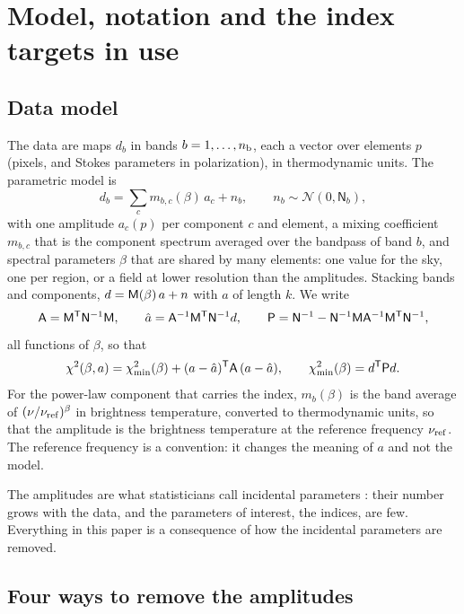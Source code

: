 \section{Model, notation and the index targets in use}
\label{sec:model}

\subsection{Data model}

The data are maps $d_b$ in bands $b = 1,\dots,n_{\rm b}$, each a vector over elements $p$ (pixels,
and Stokes parameters in polarization), in thermodynamic units. The parametric model is
\begin{equation}
  d_b = \sum_c m_{b,c}(\beta)\, a_c + n_b , \qquad n_b \sim \mathcal{N}(0, \mathsf{N}_b),
  \label{eq:model}
\end{equation}
with one amplitude $a_c(p)$ per component $c$ and element, a mixing coefficient $m_{b,c}$ that is the
component spectrum averaged over the bandpass of band $b$, and spectral parameters $\beta$ that are
shared by many elements: one value for the sky, one per region, or a field at lower resolution than
the amplitudes. Stacking bands and components, $d = \mathsf{M}(\beta)\,a + n$ with $a$ of length $k$. We write
\begin{equation}
  \mathsf{A} = \mathsf{M}^{\mathsf{T}} \mathsf{N}^{-1} \mathsf{M} , \qquad \hat a = \mathsf{A}^{-1} \mathsf{M}^{\mathsf{T}} \mathsf{N}^{-1} d , \qquad
  \mathsf{P} = \mathsf{N}^{-1} - \mathsf{N}^{-1} \mathsf{M} \mathsf{A}^{-1} \mathsf{M}^{\mathsf{T}} \mathsf{N}^{-1} ,
\end{equation}
all functions of $\beta$, so that
\begin{equation}
  \chi^2(\beta, a) = \chi^2_{\min}(\beta) + (a - \hat a)^{\mathsf{T}} \mathsf{A}\, (a - \hat a), \qquad \chi^2_{\min}(\beta) = d^{\mathsf{T}} \mathsf{P} d .
  \label{eq:chisplit}
\end{equation}
For the power-law component that carries the index, $m_{b}(\beta)$ is the band average of
$(\nu/\nu_{\mathrm{ref}})^{\beta}$ in brightness temperature, converted to thermodynamic units, so that the
amplitude is the brightness temperature at the reference frequency $\nu_{\mathrm{ref}}$. The reference frequency
is a convention: it changes the meaning of $a$ and not the model.

The amplitudes are what statisticians call incidental parameters \citep{neyman1948}: their number
grows with the data, and the parameters of interest, the indices, are few. Everything in this paper
is a consequence of how the incidental parameters are removed.

\subsection{Four ways to remove the amplitudes}

